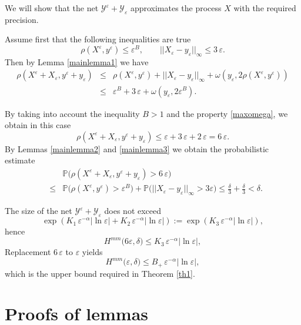 \documentclass[12pt]{article}
\let\de\delta
\let\ep\varepsilon
\newcommand{\prob}{\mathbb{P}}
\newcommand\ro{\rho}
\newcommand\YY{\mathcal Y}
\let\le\leqslant
\theoremstyle{definition}
\begin{document}
 We will show that the net $\YY^\ep + \YY_\ep$ approximates the process $X$ with the required precision. 

Assume first that the following inequalities are true 
\[
   \ro(X^\ep, y^\ep) \le \ep^B,   \qquad  ||X_\ep - y_\ep||_\infty \le 3\, \ep.
\]
Then by Lemma \ref{mainlemma1} we have
\begin{eqnarray*}
   \ro(X^\ep + X_\ep, y^\ep+ y_\ep) 
   &\le& \ro(X^\ep, y^\ep) +  ||X_\ep - y_\ep||_\infty +  \omega(y_\ep,2  \ro(X^\ep, y^\ep) )
\\
  &\le&  \ep^B  +  3 \, \ep  + \omega(y_\ep,2\ep^B).
\end{eqnarray*}
    
By taking into account the inequality $B>1$ and the property \eqref{maxomega}, 
we obtain in this case
\[
    \ro(X^\ep + X_\ep, y^\ep+ y_\ep) \le \ep +  3\,\ep  +2\,\ep = 6\, \ep.
\]
By Lemmas \ref{mainlemma2}  and \ref{mainlemma3} we obtain the probabilistic estimate
\begin{eqnarray*}
     && \prob\big(\ro(X^\ep + X_\ep, y^\ep+ y_\ep) > 6\,\ep \big)
\\
    &\le& \prob\big(\ro(X^\ep, y^\ep) > \ep^B \big) 
            + \prob\big(||X_\ep - y_\ep||_\infty > 3 \ep\big) 
    \le   \frac{\de} 3 +   \frac {\de} 3  < \de.
\end{eqnarray*}
    
The size of the net $\YY^\ep + \YY_\ep$ does not exceed
\begin{equation*}
        \exp(K_1 \, \ep^{-\alpha}|\ln\ep| + K_2\, \ep^{-\alpha}|\ln\ep|) 
        := \exp(K_3\, \ep^{-\alpha}|\ln\ep|),
\end{equation*}
hence
\begin{equation*}
        H^{mm}\Big(6\ep, \de\Big) \le K_3 \, \ep^{-\alpha}|\ln\ep|,
\end{equation*}
Replacement $ 6\,\ep$ to  $\ep$ yields
\begin{equation*}
        H^{mm}\big(\ep, \de\big) \le B_+ \, \ep^{-\alpha}|\ln\ep|,
\end{equation*}
which is the upper bound required in Theorem \ref{th1}.


\section{Proofs of lemmas} 
\label{s:lemmasproofs}
\end{document}
